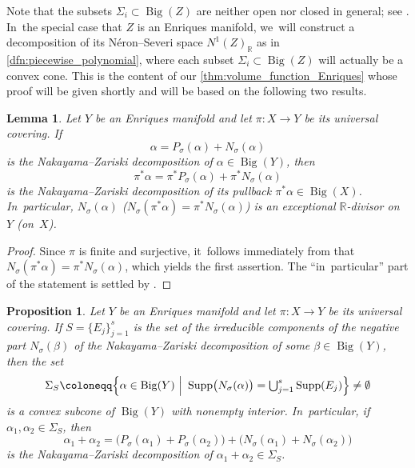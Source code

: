 \documentclass[JEP,XML,SOM,Unicode,published]{cedram}
\let\ts\textstyle
\theoremstyle{plain}
\newtheorem{prop}[thm]{Proposition}
\newtheorem{lem}[thm]{Lemma}
\theoremstyle{definition}
\newcommand{\R}{\mathbb{R}}
\DeclareMathOperator{\Supp}{Supp}
\DeclareMathOperator{\BgCn}{\mathrm{Big}}
\begin{document}
Note that the subsets $\Sigma_i \subset \BgCn(Z)$ are neither open nor closed in general; see \cite[Ex.\,5.1]{Denisi23}. In~the special case that $Z$ is an Enriques manifold, we~will construct a decomposition of its Néron--Severi space $N^1(Z)_\R$ as in \autoref{dfn:piecewise_polynomial},
where each subset $\Sigma_i \subset \BgCn(Z)$ will actually be a convex cone.
This is the content of our \autoref{thm:volume_function_Enriques} whose proof will be given shortly and will be based on the following two results.

\begin{lem}
\label{lem:NZD_EM_vs_IHS}
Let $Y$ be an Enriques manifold and let $\pi \colon X \to Y$ be its universal covering.
If
\[
\alpha = P_\sigma (\alpha) + N_\sigma(\alpha)
\]
is the Nakayama--Zariski decomposition of $\alpha \in \BgCn(Y)$, then
\[
\pi^* \alpha = \pi^* P_\sigma(\alpha) + \pi^* N_\sigma(\alpha)
\]
is the Nakayama--Zariski decomposition of its pullback $\pi^* \alpha \in \BgCn(X)$. In~particular, $N_\sigma(\alpha)$ (\resp $N_\sigma(\pi^*\alpha) = \pi^* N_\sigma(\alpha)$) is an exceptional $\R$\nobreakdash-divisor on $Y$ (\resp on~$X$).
\end{lem}

\begin{proof}
Since $\pi$ is finite and surjective, it~follows immediately from \cite[Th.\,III.5.16]{Nak04book} that $N_\sigma (\pi^* \alpha) = \pi^* N_\sigma(\alpha)$, which yields the first assertion. The \enquote{in~particular} part of the statement is settled by \cite[Th.\,3.12(i)]{Boucksom04}.
\end{proof}

\begin{prop}
\label{prop:BZC_EM}
Let $Y$ be an Enriques manifold and let $\pi \colon X \to Y$ be its universal covering.
If $S = \{ E_j \}_{j=1}^s $ is the set of the irreducible components of the negative part $N_\sigma(\beta)$ of the Nakayama--Zariski decomposition of some $\beta \in \BgCn(Y)$, then the set
\[\ts
\Sigma_S \coloneqq \Bigl\{ \alpha \in \BgCn(Y) \ \Big| \ \Supp \bigl(N_{\sigma}(\alpha) \bigr) = \bigcup_{j=1}^s \Supp(E_j) \Bigr\} \neq \emptyset
\]
is a convex subcone of $\BgCn(Y)$ with nonempty interior. In~particular, if $\alpha_1, \alpha_2 \in \Sigma_S$, then
\[
\alpha_1 + \alpha_2 = \bigl(P_\sigma(\alpha_1) + P_\sigma(\alpha_2) \bigr) + \bigl(N_\sigma(\alpha_1) + N_\sigma(\alpha_2) \bigr)
\]
is the Nakayama--Zariski decomposition of $\alpha_1 + \alpha_2 \in \Sigma_S$.
\end{prop}
\end{document}

